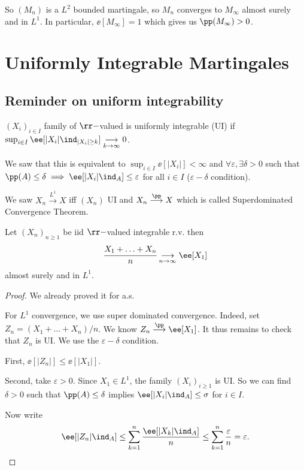 \documentclass[../main.tex]{subfiles}
\begin{document}
  So $(M_n)$ is a $L^2$ bounded martingale, so $M_n$ converges to $M_{\infty}$
  almost surely and in $L^1$. In particular, $\ee[M_{\infty}] = 1$ which gives
  us $\pp(M_{\infty}) > 0$.

  \section{Uniformly Integrable Martingales}
  \subsection{Reminder on uniform integrability}
  \begin{definition}
    $(X_i)_{i \in I}$ family of $\rr-$valued is uniformly integrable (UI) if 
    \\
    $\sup_{i \in I} \ee[|X_i| \ind_{|X_i| \geq k}] \underset{k \to
    \infty}{\longrightarrow} 0$.
  \end{definition}
    We saw that this is equivalent to $\sup_{i \in I} \ee[|X_i|] < \infty$ and
    $\forall \varepsilon, \exists \delta > 0$ such that $\pp(A) \leq \delta
    \implies \ee [|X_i| \ind_{A}] \leq \varepsilon$ for all $i \in I$
    ($\varepsilon-\delta$ condition). 

  We saw $X_n \overset{ L^1}{\longrightarrow} X$ iff $(X_n)$ UI and $X_n
  \overset{\pp}{\longrightarrow}X$ which is called Superdominated Convergence
  Theorem.

  \begin{theorem}
    Let $(X_n)_{n \geq 1}$ be iid $\rr-$valued integrable r.v. then
    \[
      \cfrac{X_1 + \ldots + X_n}{n} \underset{n \to \infty}{\longrightarrow}
      \ee[X_1]
    \]
    almost surely and in $L^1$.
  \end{theorem}
  \begin{proof}
      We already proved it for a.s.

      For $L^1$ convergence, we use super dominated convergence. Indeed, set
      $Z_n = (X_1 + \ldots + X_n) / n$. We know $Z_n
      \overset{\pp}{\longrightarrow} \ee[X_1]$. It thus remains to check that
      $Z_n$ is UI. We use the $\varepsilon-\delta$ condition.

      First, $\ee[|Z_n|] \leq \ee[|X_1|]$. 

      Second, take $\varepsilon > 0$. Since $X_1 \in L^1$, the family $(X_i)_{i
      \geq 1}$ is UI. So we can find $\delta > 0$ such that 
      $\pp(A) \leq \delta$ implies $\ee[|X_i| \ind_{A}] \leq \sigma$ for $i \in
      I$.
      
      Now write
      \[
        \ee[|Z_n| \ind_{A}] \leq \sum_{k=1}^n \frac{\ee[|X_k| \ind_A]}{n} \leq
        \sum_{k=1}^n \frac{\varepsilon}{n} = \varepsilon
      .\] 
  \end{proof}
\end{document}
